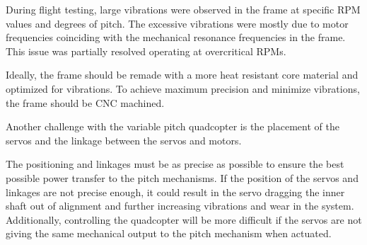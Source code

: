 During flight testing, large vibrations were observed in the frame at specific RPM values and degrees of pitch. The excessive vibrations were mostly due to motor frequencies coinciding with the mechanical resonance frequencies in the frame. This issue was partially resolved operating at overcritical RPMs.\bigskip

Ideally, the frame should be remade with a more heat resistant core material and optimized for vibrations. To achieve maximum precision and minimize vibrations, the frame should be CNC machined.\bigskip

Another challenge with the variable pitch quadcopter is the placement of the servos and the linkage between the servos and motors. \bigskip

The positioning and linkages must be as precise as possible to ensure the best possible power transfer to the pitch mechanisms. If the position of the servos and linkages are not precise enough, it could result in the servo dragging the inner shaft out of alignment and further increasing vibrations and wear in the system. Additionally, controlling the quadcopter will be more difficult if the servos are not giving the same mechanical output to the pitch mechanism when actuated.


\newpage


